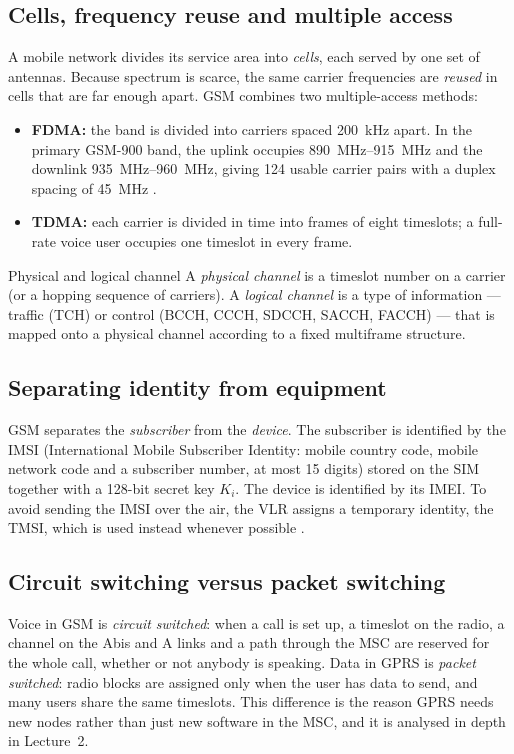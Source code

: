 \documentclass[11pt,a4paper]{article}
\begin{document}
\subsection{Cells, frequency reuse and multiple access}
A mobile network divides its service area into \emph{cells}, each served by one
set of antennas. Because spectrum is scarce, the same carrier frequencies are
\emph{reused} in cells that are far enough apart. GSM combines two multiple-access
methods:
\begin{itemize}
  \item \textbf{FDMA:} the band is divided into carriers spaced \qty{200}{\kilo\hertz}
        apart. In the primary GSM-900 band, the uplink occupies \qtyrange{890}{915}{\mega\hertz}
        and the downlink \qtyrange{935}{960}{\mega\hertz}, giving 124 usable carrier pairs
        with a duplex spacing of \qty{45}{\mega\hertz} \cite{ts45002}.
  \item \textbf{TDMA:} each carrier is divided in time into frames of eight
        timeslots; a full-rate voice user occupies one timeslot in every frame.
\end{itemize}

\begin{definitionbox}{Physical and logical channel}
A \emph{physical channel} is a timeslot number on a carrier (or a hopping sequence of
carriers). A \emph{logical channel} is a type of information --- traffic (TCH) or
control (BCCH, CCCH, SDCCH, SACCH, FACCH) --- that is mapped onto a physical channel
according to a fixed multiframe structure.
\end{definitionbox}

\subsection{Separating identity from equipment}
GSM separates the \emph{subscriber} from the \emph{device}. The subscriber is
identified by the IMSI (International Mobile Subscriber Identity: mobile country
code, mobile network code and a subscriber number, at most 15 digits) stored on the
SIM together with a 128-bit secret key $K_i$. The device is identified by its IMEI.
To avoid sending the IMSI over the air, the VLR assigns a temporary identity, the
TMSI, which is used instead whenever possible \cite{ts23003}.

\subsection{Circuit switching versus packet switching}
Voice in GSM is \emph{circuit switched}: when a call is set up, a timeslot on the
radio, a channel on the Abis and A links and a path through the MSC are reserved
for the whole call, whether or not anybody is speaking. Data in GPRS is
\emph{packet switched}: radio blocks are assigned only when the user has data to
send, and many users share the same timeslots. This difference is the reason GPRS
needs new nodes rather than just new software in the MSC, and it is analysed in
depth in Lecture~2.
\end{document}
